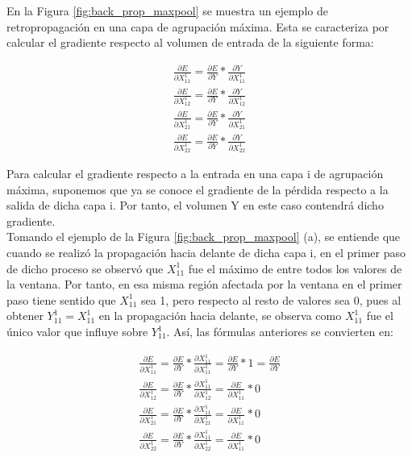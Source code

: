 En la Figura \ref{fig:back_prop_maxpool} se muestra un ejemplo de retropropagación en una capa de agrupación máxima. Esta se caracteriza por calcular el gradiente respecto al volumen de entrada de la siguiente forma:

\begin{gather}
	\frac{\partial E}{\partial X^1_{11}} = \frac{\partial E}{\partial Y} * \frac{\partial Y}{\partial X^1_{11}} \\
	\frac{\partial E}{\partial X^1_{12}} = \frac{\partial E}{\partial Y} * \frac{\partial Y}{\partial X^1_{12}} \\
	\frac{\partial E}{\partial X^1_{21}} = \frac{\partial E}{\partial Y} * \frac{\partial Y}{\partial X^1_{21}} \\
	\frac{\partial E}{\partial X^1_{22}} = \frac{\partial E}{\partial Y} * \frac{\partial Y}{\partial X^1_{22}}
\end{gather}

Para calcular el gradiente respecto a la entrada en una capa i de agrupación máxima, suponemos que ya se conoce el gradiente de la pérdida respecto a la salida de dicha capa i. Por tanto, el volumen Y en este caso contendrá dicho gradiente. \\ 
Tomando el ejemplo de la Figura \ref{fig:back_prop_maxpool} (a), se entiende que cuando se realizó la propagación hacia delante de dicha capa i, en el primer paso de dicho proceso se observó que $X^1_{11}$ fue el máximo de entre todos los valores de la ventana. Por tanto, en esa misma región afectada por la ventana en el primer paso tiene sentido que $X^1_{11}$ sea 1, pero respecto al resto de valores sea 0, pues al obtener $Y^1_{11} = X^1_{11}$ en la propagación hacia delante, se observa como $X^1_{11}$ fue el único valor que influye sobre $Y^1_{11}$. Así, las fórmulas anteriores se convierten en:

\begin{gather}
	\frac{\partial E}{\partial X^1_{11}} = \frac{\partial E}{\partial Y} * \frac{\partial X^1_{11}}{\partial X^1_{11}} = \frac{\partial E}{\partial Y} * 1 = \frac{\partial E}{\partial Y} \\
	\frac{\partial E}{\partial X^1_{12}} = \frac{\partial E}{\partial Y} * \frac{\partial X^1_{11}}{\partial X^1_{12}} = \frac{\partial E}{\partial X^1_{11}} * 0 \\
	\frac{\partial E}{\partial X^1_{21}} = \frac{\partial E}{\partial Y} * \frac{\partial X^1_{11}}{\partial X^1_{21}} = \frac{\partial E}{\partial X^1_{11}} * 0 \\
	\frac{\partial E}{\partial X^1_{22}} = \frac{\partial E}{\partial Y} * \frac{\partial X^1_{11}}{\partial X^1_{22}} = \frac{\partial E}{\partial X^1_{11}} * 0
\end{gather}


